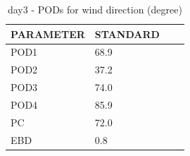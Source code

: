 \begin{table}[p!]
\begin{center}
\begin{tabular}{|l|l|l|l|}
\hline
\multicolumn{1}{|c|}{\cellcolor[HTML]{C0C0C0}\textbf{PARAMETER}} & \multicolumn{1}{c|}{\cellcolor[HTML]{C0C0C0}\textbf{STANDARD}}\\
\hline
\cellcolor[HTML]{C0C0C0}POD1  & 68.9      \\
\cellcolor[HTML]{C0C0C0}POD2  & 37.2      \\
\cellcolor[HTML]{C0C0C0}POD3  & 74.0      \\
\cellcolor[HTML]{C0C0C0}POD4  & 85.9      \\
\cellcolor[HTML]{C0C0C0}PC    & 72.0        \\
\cellcolor[HTML]{C0C0C0}EBD   & 0.8       \\
\hline
\end{tabular}
\caption{day3 - PODs for wind direction (degree)}
\label{tab:podwd:day3}
\end{center}
\end{table}
